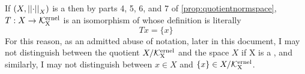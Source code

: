 \begin{rmk}
\label{rmk:quotientnormedspace}
    If $(X,\left|\left| \cdot \right|\right|_X)$
    is a \NormedSpace
    then by parts
    4, 5, 6, and 7 of
    \ref{prop:quotientnormspace}, 
    $T:X \to \bf\mathcal{K}\rm^{ernel}_X$
    is an isomorphism of 
    \NormedSpaces whose 
    definition is literally
    \begin{equation}
    Tx=\{x\}
    \end{equation}
    For this reason, 
    as an admitted abuse of notation, 
    later in this document,
    I may not distinguish between the quotient
    $X/\bf\mathcal{K}\rm^{ernel}_X$ and the space $X$ if
    X is a \NormedSpace, 
    and similarly, I may not distinguish between 
    $x \in X$ and $\{x\} \in X/\bf\mathcal{K}\rm^{ernel}_X$. 
\end{rmk}
